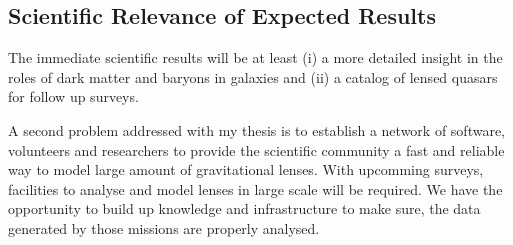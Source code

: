 \documentclass[11pt]{article}
\begin{document}
\subsection{Scientific Relevance of Expected Results}

The immediate scientific results will be at least (i) a more detailed insight in the roles of dark matter and baryons in galaxies and (ii) a catalog of lensed quasars for follow up surveys.

A second problem addressed with my thesis is to establish a network of software, volunteers and researchers to provide the scientific community a fast and reliable way to model large amount of gravitational lenses.
With upcomming surveys, facilities to analyse and model lenses in large scale will be required.
We have the opportunity to build up knowledge and infrastructure to make sure, the data generated by those missions are properly analysed.


\newpage


\end{document}
